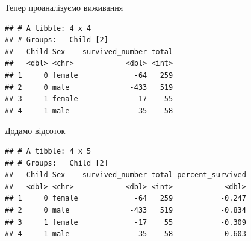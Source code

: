 \documentclass[ignorenonframetext,]{beamer}
\newenvironment{Shaded}{\begin{snugshade}}{\end{snugshade}}
\newcommand{\DataTypeTok}[1]{\textcolor[rgb]{0.13,0.29,0.53}{#1}}
\newcommand{\DecValTok}[1]{\textcolor[rgb]{0.00,0.00,0.81}{#1}}
\newcommand{\KeywordTok}[1]{\textcolor[rgb]{0.13,0.29,0.53}{\textbf{#1}}}
\newcommand{\NormalTok}[1]{#1}
\newcommand{\OperatorTok}[1]{\textcolor[rgb]{0.81,0.36,0.00}{\textbf{#1}}}
\newcommand{\StringTok}[1]{\textcolor[rgb]{0.31,0.60,0.02}{#1}}
\begin{document}
\begin{frame}[fragile]{Тепер проаналізуємо виживання}
\protect\hypertarget{ux442ux435ux43fux435ux440-ux43fux440ux43eux430ux43dux430ux43bux456ux437ux443ux454ux43cux43e-ux432ux438ux436ux438ux432ux430ux43dux43dux44f}{}

\begin{Shaded}
\end{Shaded}

\begin{verbatim}
## # A tibble: 4 x 4
## # Groups:   Child [2]
##   Child Sex    survived_number total
##   <dbl> <chr>            <dbl> <int>
## 1     0 female             -64   259
## 2     0 male              -433   519
## 3     1 female             -17    55
## 4     1 male               -35    58
\end{verbatim}

\end{frame}

\begin{frame}[fragile]{Додамо відсоток}
\protect\hypertarget{ux434ux43eux434ux430ux43cux43e-ux432ux456ux434ux441ux43eux442ux43eux43a}{}

\begin{Shaded}
\end{Shaded}

\begin{verbatim}
## # A tibble: 4 x 5
## # Groups:   Child [2]
##   Child Sex    survived_number total percent_survived
##   <dbl> <chr>            <dbl> <int>            <dbl>
## 1     0 female             -64   259           -0.247
## 2     0 male              -433   519           -0.834
## 3     1 female             -17    55           -0.309
## 4     1 male               -35    58           -0.603
\end{verbatim}

\end{frame}
\end{document}
